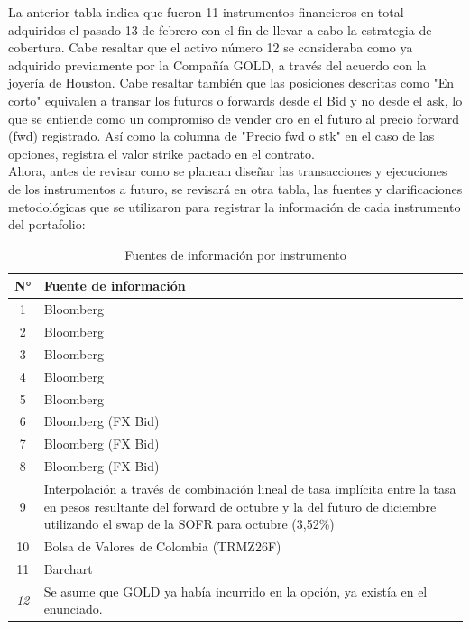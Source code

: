 \documentclass{article}
\theoremstyle{remark}
\theoremstyle{definition}
\begin{document}
La anterior tabla indica que fueron 11 instrumentos financieros en total adquiridos el pasado 13 de febrero con el fin de llevar a cabo la estrategia de cobertura. Cabe resaltar que el activo número 12 se consideraba como ya adquirido previamente por la Compañía GOLD, a través del acuerdo con la joyería de Houston. Cabe resaltar también que las posiciones descritas como "En corto" equivalen a transar los futuros o forwards desde el Bid y no desde el ask, lo que se entiende como un compromiso de vender oro en el futuro al precio forward (fwd) registrado. Así como la columna de "Precio fwd o stk" en el caso de las opciones, registra el valor strike pactado en el contrato.\\

Ahora, antes de revisar como se planean diseñar las transacciones y ejecuciones de los instrumentos a futuro, se revisará en otra tabla, las fuentes y clarificaciones metodológicas que se utilizaron para registrar la información de cada instrumento del portafolio:

\begin{table}[H]
\centering
\caption{Fuentes de información por instrumento}
\footnotesize
\renewcommand{\arraystretch}{1.2}

\begin{tabularx}{0.75\textwidth}{c X}
\toprule
\textbf{N°} & \textbf{Fuente de información} \\
\midrule

1 & Bloomberg \\
2 & Bloomberg \\
3 & Bloomberg \\
4 & Bloomberg \\
5 & Bloomberg \\

\midrule

6 & Bloomberg (FX Bid) \\
7 & Bloomberg (FX Bid) \\
8 & Bloomberg (FX Bid) \\
9 & Interpolación a través de combinación lineal de tasa implícita entre la tasa en pesos resultante del forward de octubre y la del futuro de diciembre utilizando el swap de la SOFR para octubre (3,52\%) \\
10 & Bolsa de Valores de Colombia (TRMZ26F) \\

\midrule

11 & Barchart \\
\textit{12} & Se asume que GOLD ya había incurrido en la opción, ya existía en el enunciado. \\

\bottomrule
\end{tabularx}
\end{table}
\end{document}
